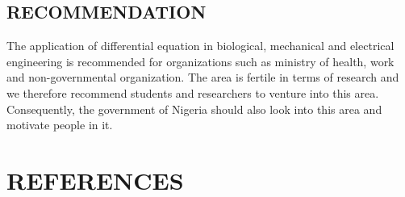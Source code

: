 \documentclass[11pt]{report}
\begin{document}
	
	\section{RECOMMENDATION}
	The application of differential equation in biological, mechanical and electrical engineering is recommended for organizations such as ministry of health, work and non-governmental organization. The area is fertile in terms of research and we therefore recommend students and researchers to venture into this area. Consequently, the government of Nigeria should also look into this area and motivate people in it.  
	
	
	\chapter*{REFERENCES}
	
\end{document}
